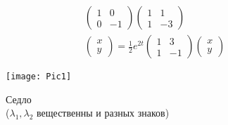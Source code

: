 \begin{figure}[!h]
\begin{minipage}[h]{0.49\linewidth}
\begin{gather*}
			\begin{pmatrix}
				1 & 0\\
				0 & -1
			\end{pmatrix}
			\begin{pmatrix}
				1 & 1\\
				1 & -3
			\end{pmatrix}\\
			\begin{pmatrix}
				x \\ y
			\end{pmatrix}
			=
			\frac{1}{2} e^{2t}
			\begin{pmatrix}
				1 & 3\\
				1 & -1
			\end{pmatrix}
			\begin{pmatrix}
				x \\ y
			\end{pmatrix}
		\end{gather*}
	\end{minipage}
	\begin{minipage}[h]{0.49\linewidth}
		\texttt{[image: Pic1]}
		\caption{Седло \\ ($\lambda_1, \lambda_2$ вещественны и разных знаков)}
	\end{minipage}
\end{figure}


\newpage
